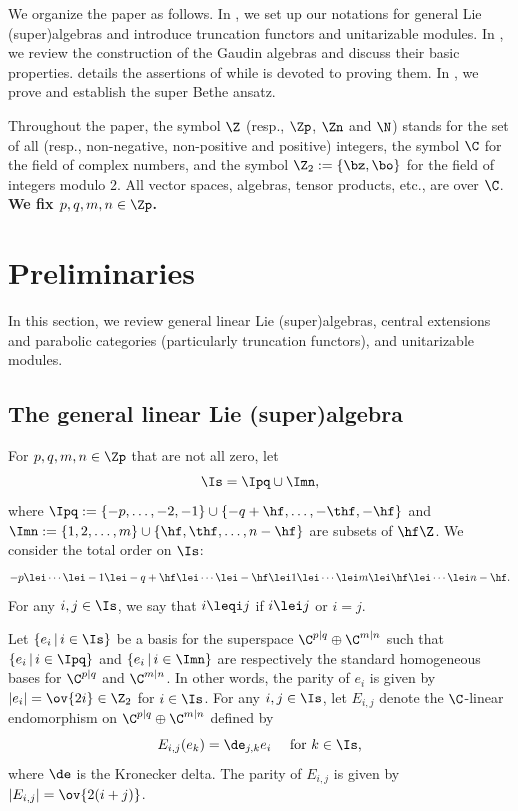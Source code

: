 \documentclass[11pt, reqno]{amsart}
\theoremstyle{definition}
\theoremstyle{remark}
\numberwithin{equation}{section}
\begin{document}
We organize the paper as follows.
In , we set up our notations for general Lie (super)algebras and introduce truncation functors and unitarizable modules.
In , we review the construction of the Gaudin algebras and discuss their basic properties.
 details the assertions of  while  is devoted to proving them.
In , we prove  and establish the super Bethe ansatz.


\vskip 3mm
Throughout the paper, the symbol $\Z$ (resp., $\Zp$, $\Zn$ and $\N$) stands for the set of all (resp., non-negative, non-positive and positive) integers, the symbol $\C$ for the field of complex numbers, and the symbol $\Z_2:=\{\bz, \bo\}$ for the field of integers modulo 2. All vector spaces, algebras, tensor products, etc., are over $\C$.
{\bf We fix $p, q, m, n \in \Zp$.}
\vskip 3mm



\section{Preliminaries} \label{Pre}

In this section, we review general linear Lie (super)algebras, central extensions and parabolic categories (particularly truncation functors), and unitarizable modules.

\subsection{The general linear Lie (super)algebra}  \label{gls}
\sloppy
For $p, q, m, n \in \Zp$ that are not all zero, let
$$
 \Is=\Ipq \cup \Imn ,
$$
where
$\Ipq:=\{ -p, \ldots, -2, -1\} \cup \left\{-q+\hf, \ldots, -\thf, -\hf \right\}$
and $\Imn:=\{ 1, 2, \ldots, m\} \cup \left\{\hf, \thf, \ldots, n-\hf \right\}$ are subsets of $\hf \Z$.
%
We consider the total order on $\Is$:
$$
-p \lei \cdots \lei -1 \lei -q+\hf \lei \cdots \lei -\hf \lei 1 \lei \cdots \lei m \lei \hf \lei \cdots \lei n-\hf.
$$
For any $i, j \in \Is$, we say that $i \leqi j$ if $i \lei j$ or $i=j$.

Let $\{e_i \, | \, i \in \Is \}$ be a basis for the superspace $\C^{p|q}\oplus\C^{m|n}$ such that $\{e_i \, | \, i \in \Ipq \}$ and
$\{e_{i} \, | \, i \in \Imn \}$ are respectively the standard homogeneous bases for $\C^{p|q}$ and $\C^{m|n}$. In other words, the parity of $e_i$ is given by
$|e_i|=\ov{2i}\in \Z_2$ for $i \in \Is$.
%
For any $i, j \in \Is$, let $E_{i,j}$ denote the $\C$-linear endomorphism on $\C^{p|q}\oplus\C^{m|n}$ defined by
$$
E_{i,j} (e_k)=\de_{j, k} e_i \quad \mbox{ for $k \in \Is$,}
$$
where $\de$ is the Kronecker delta. The parity of $E_{i,j}$ is given by $|E_{i,j}|=\ov{2(i+j)}$.
\end{document}
